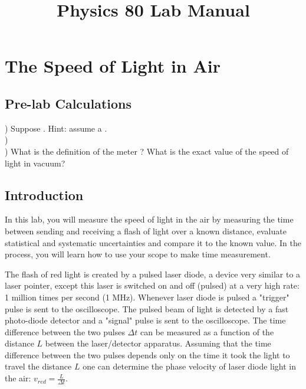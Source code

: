\documentclass[12pt,oneside]{book}
\begin{document}

\title{Physics 80 Lab Manual}

\maketitle

\chapter{The Speed of Light in Air }

\section{Pre-lab Calculations}
) Suppose .  Hint: assume a . \\ 

)   \\

) What is the definition of the meter ? What is the exact value of the speed of light in vacuum?

\section{Introduction}

In this lab, you will measure the speed of light in the air by measuring the time between sending and receiving a flash of light over a known distance, evaluate statistical and systematic uncertainties and compare it to the known value.  In the process, you will learn how to use your scope to make time measurement.

The flash of red light is created by a pulsed laser diode, a device very similar to a laser pointer, except this laser is switched on and off (pulsed) at a very high rate: 1 million times per second (1 MHz).  Whenever laser diode is pulsed a "trigger" pulse is sent to the oscilloscope. The pulsed beam of light is detected by a fast photo-diode detector and a "signal" pulse is sent to the oscilloscope. The time difference between the two pulses $\Delta t$ can be measured as a function of the distance $L$ between the laser/detector apparatus. 
Assuming that the time difference between the two pulses depends only on the time it took the light to travel the distance $L$ one can determine the  phase velocity of laser diode light in the air:   $v_{red}=\frac{L}{\Delta t}$.
\end{document}
